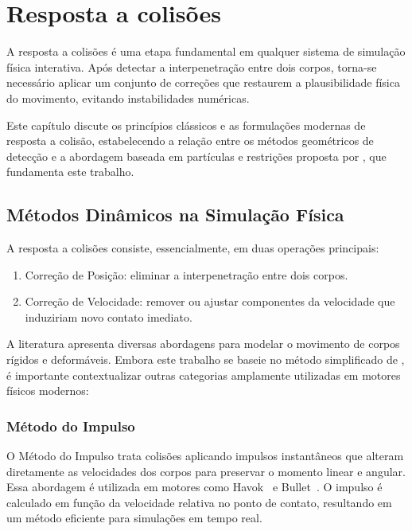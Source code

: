\chapter{Resposta a colisões}

A resposta a colisões é uma etapa fundamental em qualquer sistema de simulação física interativa. Após detectar a interpenetração entre dois corpos, torna-se necessário aplicar um conjunto de correções que restaurem a plausibilidade física do movimento, evitando instabilidades numéricas.

Este capítulo discute os princípios clássicos e as formulações modernas de resposta a colisão, estabelecendo a relação entre os métodos geométricos de detecção e a abordagem baseada em partículas e restrições proposta por , que fundamenta este trabalho.

\section{Métodos Dinâmicos na Simulação Física}

A resposta a colisões consiste, essencialmente, em duas operações principais:
\begin{enumerate}
	\item Correção de Posição: eliminar a interpenetração entre dois corpos.
	\item Correção de Velocidade: remover ou ajustar componentes da velocidade que induziriam novo contato imediato.
\end{enumerate}
A literatura apresenta diversas abordagens para modelar o movimento de corpos rígidos e deformáveis. Embora este trabalho se baseie no método simplificado de , é importante contextualizar outras categorias amplamente utilizadas em motores físicos modernos:

\subsection*{Método do Impulso}

O Método do Impulso trata colisões aplicando impulsos instantâneos que alteram diretamente as velocidades dos corpos para preservar o momento linear e angular. Essa abordagem é utilizada em motores como Havok~\cite{havok_physics} e Bullet~\cite{bullet_physics}. O impulso é calculado em função da velocidade relativa no ponto de contato, resultando em um método eficiente para simulações em tempo real.

